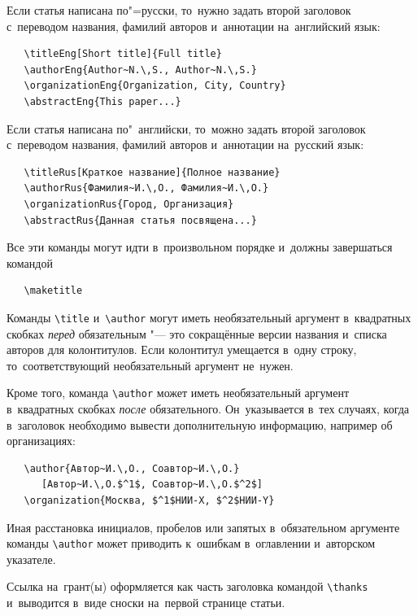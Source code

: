 \documentclass[12pt,twoside]{article}
\begin{document}
Если статья написана по"=русски, то~нужно задать второй заголовок
с~переводом названия, фамилий авторов и~аннотации на~английский язык:
{\small\begin{verbatim}
   \titleEng[Short title]{Full title}
   \authorEng{Author~N.\,S., Author~N.\,S.}
   \organizationEng{Organization, City, Country}
   \abstractEng{This paper...}
\end{verbatim}}

Если статья написана по"~английски, то~можно задать второй заголовок
с~переводом названия, фамилий авторов и~аннотации на~русский язык:
{\small\begin{verbatim}
   \titleRus[Краткое название]{Полное название}
   \authorRus{Фамилия~И.\,О., Фамилия~И.\,О.}
   \organizationRus{Город, Организация}
   \abstractRus{Данная статья посвящена...}
\end{verbatim}}

Все эти команды  могут идти в~произвольном порядке
и~должны завершаться командой
{\small\begin{verbatim}
   \maketitle
\end{verbatim}}


Команды \verb|\title| и~\verb|\author|
могут иметь необязательный аргумент в~квадратных скобках \emph{перед} обязательным "---
это сокращённые версии названия и~списка авторов для колонтитулов.
Если колонтитул умещается в~одну строку, то~соответствующий необязательный аргумент не~нужен.

Кроме того, команда \verb'\author' может иметь необязательный аргумент в~квадратных скобках \emph{после} обязательного.
Он~указывается в~тех случаях, когда в~заголовок необходимо вывести дополнительную информацию, например об организациях:
{\small\begin{verbatim}
   \author{Автор~И.\,О., Соавтор~И.\,О.}
      [Автор~И.\,О.$^1$, Соавтор~И.\,О.$^2$]
   \organization{Москва, $^1$НИИ-X, $^2$НИИ-Y}
\end{verbatim}}

Иная расстановка инициалов, пробелов или запятых в~обязательном аргументе команды \verb'\author'
может приводить к~ошибкам в~оглавлении и~авторском указателе.

Ссылка на~грант(ы) оформляется как часть заголовка командой \verb'\thanks'
и~выводится в~виде сноски на~первой странице статьи.
\end{document}
